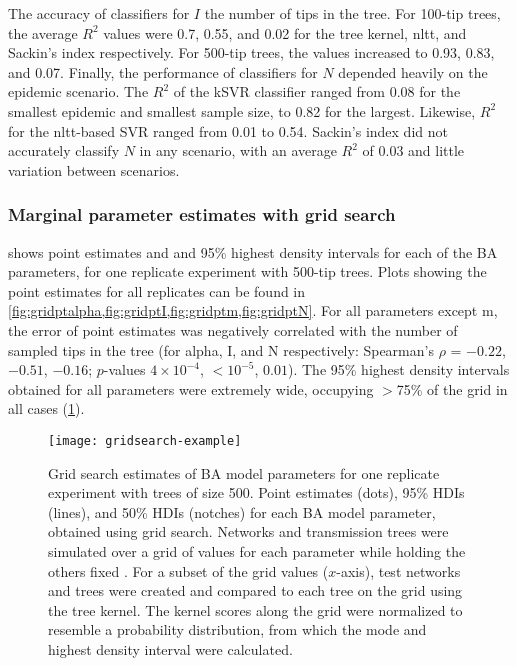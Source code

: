 The accuracy of classifiers for $I$  the number of tips in the
tree. For 100-tip trees, the average $R^2$ values were
  0.7,
  0.55, and
  0.02
for the tree kernel, \gls{nltt}, and Sackin's index respectively. For 500-tip
trees, the values increased to
  0.93,
  0.83, and
  0.07.
Finally, the performance of classifiers for $N$ depended heavily on the
epidemic scenario. The $R^2$ of the \gls{kSVR} classifier ranged from
  0.08
for the smallest epidemic and smallest sample size, to
  0.82
for the largest. Likewise, $R^2$ for the \gls{nltt}-based SVR ranged from 
  0.01
to
  0.54.
Sackin's index did not accurately classify $N$ in any scenario, with an average
$R^2$ of
  0.03
and little variation between scenarios.

\subsubsection*{Marginal parameter estimates with grid search}



  shows point estimates and
 and 95\% highest density intervals for each of the \gls{BA}
parameters, for one replicate experiment with 500-tip trees. Plots showing the
point estimates for all replicates can be found in
\cref{fig:gridptalpha,fig:gridptI,fig:gridptm,fig:gridptN}. For all parameters
except \gls{m}, the error of point estimates was negatively correlated with the
number of sampled tips in the tree (for \gls{alpha}, \gls{I}, and \gls{N}
respectively: Spearman's $\rho$ = 
    \ensuremath{-0.22},
    \ensuremath{-0.51}, 
    \ensuremath{-0.16}; 
$p$-values
    $4\!\times\!10^{-4}$,
    ${<}10^{-5}$,
    $0.01$).
The 95\% highest density intervals obtained for all parameters were extremely
wide, occupying $>$75\% of the grid in all cases (\cref{fig:gridest}).

\begin{figure}[ht]
    \centering
    \texttt{[image: gridsearch-example]}
    \caption[
        Grid search estimates of \gls{BA} model parameters for one replicate
        experiment with trees of size 500.
    ]{
        Grid search estimates of \gls{BA} model parameters for one replicate
        experiment with trees of size 500. Point estimates (dots), 95\%
        \glspl{HDI} (lines), and 50\% \glspl{HDI} (notches) for each \gls{BA}
        model parameter, obtained using grid search. Networks and transmission
        trees were simulated over a grid of values for each parameter while
        holding the others fixed . For a subset of the
        grid values ($x$-axis), test networks and trees were created and
        compared to each tree on the grid using the tree kernel. The kernel
        scores along the grid were normalized to resemble a probability
        distribution, from which the mode and highest density interval were
        calculated.
    } 
    \label{fig:gridest}
\end{figure}

